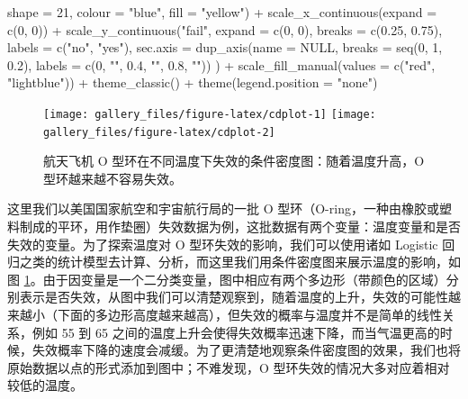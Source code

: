 \documentclass[
  b5paper,
  UTF8,twoside]{book}
\newenvironment{Shaded}{\begin{snugshade}}{\end{snugshade}}
\newcommand{\AttributeTok}[1]{\textcolor[rgb]{0.77,0.63,0.00}{#1}}
\newcommand{\ConstantTok}[1]{\textcolor[rgb]{0.00,0.00,0.00}{#1}}
\newcommand{\DecValTok}[1]{\textcolor[rgb]{0.00,0.00,0.81}{#1}}
\newcommand{\FloatTok}[1]{\textcolor[rgb]{0.00,0.00,0.81}{#1}}
\newcommand{\FunctionTok}[1]{\textcolor[rgb]{0.00,0.00,0.00}{#1}}
\newcommand{\NormalTok}[1]{#1}
\newcommand{\SpecialCharTok}[1]{\textcolor[rgb]{0.00,0.00,0.00}{#1}}
\newcommand{\StringTok}[1]{\textcolor[rgb]{0.31,0.60,0.02}{#1}}
\begin{document}
\begin{Shaded}
\begin{Highlighting}[]
    \AttributeTok{shape =} \DecValTok{21}\NormalTok{, }\AttributeTok{colour =} \StringTok{"blue"}\NormalTok{, }\AttributeTok{fill =} \StringTok{"yellow"}\NormalTok{) }\SpecialCharTok{+}
  \FunctionTok{scale\_x\_continuous}\NormalTok{(}\AttributeTok{expand =} \FunctionTok{c}\NormalTok{(}\DecValTok{0}\NormalTok{, }\DecValTok{0}\NormalTok{)) }\SpecialCharTok{+}
  \FunctionTok{scale\_y\_continuous}\NormalTok{(}\StringTok{"fail"}\NormalTok{, }\AttributeTok{expand =} \FunctionTok{c}\NormalTok{(}\DecValTok{0}\NormalTok{, }\DecValTok{0}\NormalTok{), }\AttributeTok{breaks =} \FunctionTok{c}\NormalTok{(}\FloatTok{0.25}\NormalTok{, }\FloatTok{0.75}\NormalTok{), }
    \AttributeTok{labels =} \FunctionTok{c}\NormalTok{(}\StringTok{"no"}\NormalTok{, }\StringTok{"yes"}\NormalTok{),}
    \AttributeTok{sec.axis =} \FunctionTok{dup\_axis}\NormalTok{(}\AttributeTok{name =} \ConstantTok{NULL}\NormalTok{, }
      \AttributeTok{breaks =} \FunctionTok{seq}\NormalTok{(}\DecValTok{0}\NormalTok{, }\DecValTok{1}\NormalTok{, }\FloatTok{0.2}\NormalTok{), }
      \AttributeTok{labels =} \FunctionTok{c}\NormalTok{(}\DecValTok{0}\NormalTok{, }\StringTok{""}\NormalTok{, }\FloatTok{0.4}\NormalTok{, }\StringTok{""}\NormalTok{, }\FloatTok{0.8}\NormalTok{, }\StringTok{""}\NormalTok{))}
\NormalTok{  ) }\SpecialCharTok{+}
  \FunctionTok{scale\_fill\_manual}\NormalTok{(}\AttributeTok{values =} \FunctionTok{c}\NormalTok{(}\StringTok{"red"}\NormalTok{, }\StringTok{"lightblue"}\NormalTok{)) }\SpecialCharTok{+}
  \FunctionTok{theme\_classic}\NormalTok{() }\SpecialCharTok{+}
  \FunctionTok{theme}\NormalTok{(}\AttributeTok{legend.position =} \StringTok{"none"}\NormalTok{)}
\end{Highlighting}
\end{Shaded}

\begin{figure}

{\centering \texttt{[image: gallery\_files/figure-latex/cdplot-1]} \texttt{[image: gallery\_files/figure-latex/cdplot-2]} 

}

\caption[航天飞机 O 型环在不同温度下失效的条件密度图]{航天飞机 O 型环在不同温度下失效的条件密度图：随着温度升高，O 型环越来越不容易失效。}\label{fig:cdplot}
\end{figure}

这里我们以美国国家航空和宇宙航行局的一批 O 型环（O-ring，一种由橡胶或塑料制成的平环，用作垫圈）失效数据为例，这批数据有两个变量：温度变量和是否失效的变量。为了探索温度对 O 型环失效的影响，我们可以使用诸如 Logistic 回归之类的统计模型去计算、分析，而这里我们用条件密度图来展示温度的影响，如图 \ref{fig:cdplot}。由于因变量是一个二分类变量，图中相应有两个多边形（带颜色的区域）分别表示是否失效，从图中我们可以清楚观察到，随着温度的上升，失效的可能性越来越小（下面的多边形高度越来越高），但失效的概率与温度并不是简单的线性关系，例如 55 到 65 之间的温度上升会使得失效概率迅速下降，而当气温更高的时候，失效概率下降的速度会减缓。为了更清楚地观察条件密度图的效果，我们也将原始数据以点的形式添加到图中；不难发现，O 型环失效的情况大多对应着相对较低的温度。
\end{document}
